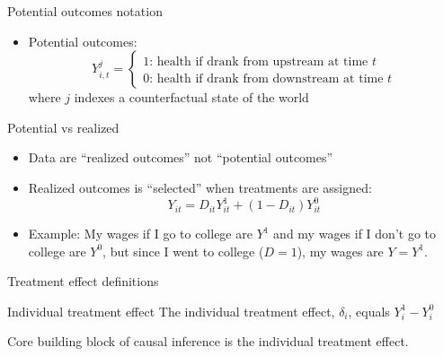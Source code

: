 \documentclass{beamer}
\begin{document}
\begin{frame}{Potential outcomes notation}
	
	\begin{itemize}

	\item Potential outcomes: $$Y_{i,t}^j =\begin{cases} 1 \text{: health if drank from upstream at time $t$} \\ 0 \text{: health if drank from downstream at time $t$} \end{cases}$$where $j$ indexes a counterfactual state of the world

	\end{itemize}
\end{frame}


\begin{frame}{Potential vs realized}

\begin{itemize}
\item Data are ``realized outcomes'' not ``potential outcomes''
\item Realized outcomes is ``selected'' when treatments are assigned: $$Y_{it}=D_{it}Y_{it}^1 + (1-D_{it})Y_{it}^0$$
\item Example: My wages if I go to college are $Y^1$ and my wages if I don't go to college are $Y^0$, but since I went to college ($D=1$), my wages are $Y=Y^1$.

\end{itemize}
\end{frame}



\begin{frame}{Treatment effect definitions}


	\begin{block}{Individual treatment effect}
	    The individual treatment effect,  $\delta_i$, equals $Y_i^1-Y_i^0$
	\end{block}

Core building block of causal inference is the individual treatment effect. 
	
\end{frame}
\end{document}
